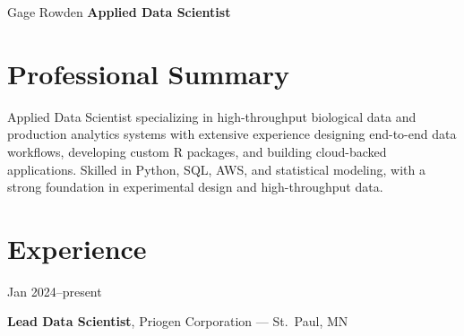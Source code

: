 \documentclass{resume}
\begin{document}
\begin{header}

    \fontsize{25 pt}{25 pt}\selectfont Gage Rowden \textbf{Applied Data Scientist}\\
    \vspace{5 pt}
    \normalsize
    \mbox{}
    \AND
    \mbox{}
    \AND
    \mbox{}
    \AND
    \mbox{}
    \AND
    \mbox{}
\end{header}

\vspace{5 pt - 0.3 cm}

\section{Professional Summary}\label{professional-summary}

\begin{centering}
\Large

Applied Data Scientist specializing in high-throughput biological data
and production analytics systems with extensive experience designing
end-to-end data workflows, developing custom R packages, and building
cloud-backed applications. Skilled in Python, SQL, AWS, and statistical
modeling, with a strong foundation in experimental design and
high-throughput data.

\end{centering}

\section{Experience}\label{experience}

\begin{twocolentry}{Jan 2024--present}

\textbf{Lead Data Scientist}, Priogen Corporation --- St.~Paul, MN

\end{twocolentry}
\end{document}

